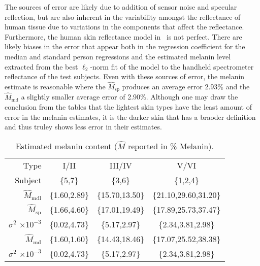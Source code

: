 \documentclass[10pt,journal,cspaper,compsoc]{IEEEtran}
\begin{document}
The sources of error are likely due to addition of sensor noise and specular reflection, but are also inherent in the 
variability amongst the reflectance of human tissue due to variations in the components that affect the reflectance.  
Furthermore, the human skin reflectance model in~\cite{Nunez8} is not perfect.  There are likely biases in the 
error that appear both in the regression coefficient for the median and standard person regressions and the 
estimated melanin level extracted from the best $\ell_2$-norm fit of the model to the handheld spectrometer reflectance 
of the test subjects.  Even with these sources of error, the melanin estimate is reasonable where the $\hat{M}_{\text{sp}}$ 
produces an average error 2.93\% and the $\hat{M}_{\text{md}}$ a slightly smaller average error of 2.90\%.  Although one may 
draw the conclusion from the tables that the lightest skin types have the least amount of error in the melanin estimates, it 
is the darker skin that has a braoder definition and thus truley shows less error in their estimates.

\begin{table}
\renewcommand{\arraystretch}{1.3}
\caption{Estimated melanin content ($\hat{M}$ reported in \% Melanin).}
\vspace{-0.5cm}
\label{tbl:NIMI_standard}
\begin{center}
\begin{tabular}{|r|c|c|c|}
\hline
Type					& I/II		& III/IV		& V/VI 	\\
Subject					& \{5,7\}	& \{3,6\}		& \{1,2,4\} \\
\hline \hline
$\hat{M}_{\text{mdl}}$		& \{1.60,2.89\}	& \{15.70,13.50\}	& \{21.10,29.60,31.20\} \\
\hline \hline
$\hat{M}_{\text{sp}}$ 			& \{1.66,4.60\}	& \{17.01,19.49\}	& \{17.89,25.73,37.47\}\\
\tiny{$\sigma^2$ $\times10^{-3}$}	& \{0.02,4.73\}	& \{5.17,2.97\}		& \{2.34,3.81,2.98\} \\
\hline \hline
$\hat{M}_{\text{md}}$			& \{1.60,1.60\}	& \{14.43,18.46\}	& \{17.07,25.52,38.38\} \\
\tiny{$\sigma^2$ $\times10^{-3}$}	& \{0.02,4.73\} & \{5.17,2.97\}		&  \{2.34,3.81,2.98\} \\
\hline
\end{tabular}
\end{center}
\end{table}
\end{document}
